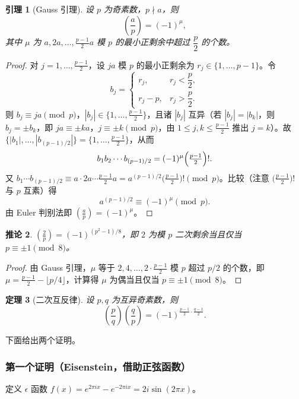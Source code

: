 \documentclass{article}
\newcommand{\leg}[2]{\left(\frac{#1}{#2}\right)}
\theoremstyle{plain}
\newtheorem{thm}{定理}[section]
\newtheorem{lem}[thm]{引理}
\newtheorem{cor}[thm]{推论}
\theoremstyle{definition}
\theoremstyle{remark}
\begin{document}
\begin{lem}[Gauss 引理]\label{lem:gauss-lemma}
  设 $p$ 为奇素数，$p\nmid a$，则
  \[
    \leg{a}{p}=(-1)^\mu,
  \]
  其中 $\mu$ 为 $a,2a,\dots,\frac{p-1}{2}a$ 模 $p$ 的最小正剩余中超过 $\dfrac p2$ 的个数。
\end{lem}

\begin{proof}
  对 $j=1,\dots,\frac{p-1}{2}$，设 $ja$ 模 $p$ 的最小正剩余为 $r_j\in\{1,\dots,p-1\}$。令
  \[
    b_j=
    \begin{cases}r_j,& r_j<\dfrac p2,\\ r_j-p,& r_j>\dfrac p2.
    \end{cases}
  \]
  则 $b_j\equiv ja\pmod p$，$|b_j|\in\{1,\dots,\frac{p-1}{2}\}$，且诸 $|b_j|$ 互异（若 $|b_j|=|b_k|$，则 $b_j=\pm b_k$，即 $ja\equiv\pm ka$，$j\equiv\pm k\pmod p$，由 $1\le j,k\le\frac{p-1}{2}$ 推出 $j=k$）。故 $\{|b_1|,\dots,|b_{(p-1)/2}|\}=\{1,\dots,\frac{p-1}{2}\}$，从而
  \[
    b_1b_2\cdots b_{(p-1)/2}=(-1)^\mu\Bigl(\tfrac{p-1}{2}\Bigr)!.
  \]
  又 $b_1\cdots b_{(p-1)/2}\equiv a\cdot2a\cdots\tfrac{p-1}{2}a=a^{(p-1)/2}\bigl(\frac{p-1}{2}\bigr)!\pmod p$。比较（注意 $\bigl(\frac{p-1}{2}\bigr)!$ 与 $p$ 互素）得
  \[
    a^{(p-1)/2}\equiv(-1)^\mu\pmod p.
  \]
  由 Euler 判别法即 $\leg{a}{p}=(-1)^\mu$。
\end{proof}

\begin{cor}\label{cor:leg-2}
  $\leg{2}{p}=(-1)^{(p^2-1)/8}$，即 $2$ 为模 $p$ 二次剩余当且仅当 $p\equiv\pm1\pmod8$。
\end{cor}

\begin{proof}
  由 Gauss 引理，$\mu$ 等于 $2,4,\dots,2\cdot\frac{p-1}{2}$ 模 $p$ 超过 $p/2$ 的个数，即 $\mu=\frac{p-1}{2}-\lfloor p/4\rfloor$，计算得 $\mu$ 为偶当且仅当 $p\equiv\pm1\pmod8$。
\end{proof}

\begin{thm}[二次互反律]\label{thm:quad-rec}
  设 $p,q$ 为互异奇素数，则
  \[
    \leg{p}{q}\leg{q}{p}=(-1)^{\frac{p-1}{2}\cdot\frac{q-1}{2}}.
  \]
\end{thm}

下面给出两个证明。

\subsubsection*{第一个证明（Eisenstein，借助正弦函数）}

定义 $\epsilon$ 函数 $f(x)=e^{2\pi i x}-e^{-2\pi i x}=2i\sin(2\pi x)$。
\end{document}

